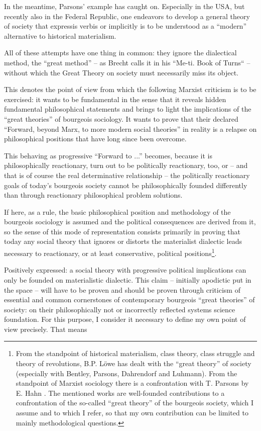 \documentclass[11pt,a4paper]{article}
\begin{document}
In the meantime, Parsons' example has caught on. Especially in the USA, but
recently also in the Federal Republic, one endeavors to develop a general
theory of society that expressis verbis or implicitly is to be understood as a
“modern” alternative to historical materialism.

All of these attempts have one thing in common: they ignore the dialectical
method, the “great method” -- as Brecht calls it in his “Me-ti. Book of Turns“
-- without which the Great Theory on society must necessarily miss its object.

This denotes the point of view from which the following Marxist criticism is
to be exercised: it wants to be fundamental in the sense that it reveals
hidden fundamental philosophical statements and brings to light the
implications of the “great theories” of bourgeois sociology. It wants to prove
that their declared \enquote{Forward, beyond Marx, to more modern social
  theories} in reality is a relapse on philosophical positions that have long
since been overcome.

This behaving as progressive \enquote{Forward to ...} becomes, because it is
philosophically reactionary, turn out to be politically reactionary, too, or
-- and that is of course the real determinative relationship -- the
politically reactionary goals of today's bourgeois society cannot be
philosophically founded differently than through reactionary philosophical
problem solutions.

If here, as a rule, the basic philosophical position and methodology of the
bourgeois sociology is assumed and the political consequences are derived from
it, so the sense of this mode of representation consists primarily in proving
that today any social theory that ignores or distorts the materialist
dialectic leads necessary to reactionary, or at least conservative, political
positions\footnote{From the standpoint of historical materialism, class
  theory, class struggle and theory of revolutions, B.P. Löwe \cite{Loewe1971}
  has dealt with the \enquote{great theory} of society (especially with
  Bentley, Parsons, Dahrendorf and Luhmann).  From the standpoint of Marxist
  sociology there is a confrontation with T. Parsons by E. Hahn
  \cite{Hahn1965}.  The mentioned works are well-founded contributions to a
  confrontation of the so-called \enquote{great theory} of the bourgeois
  society, which I assume and to which I refer, so that my own contribution
  can be limited to mainly methodological questions.}.

Positively expressed: a social theory with progressive political implications
can only be founded on materialistic dialectic. This claim -- initially
apodictic put in the space -- will have to be proven and should be proven
through criticism of essential and common cornerstones of contemporary
bourgeois \enquote{great theories} of society: on their philosophically not or
incorrectly reflected systems science foundation. For this purpose, I
consider it necessary to define my own point of view precisely. That means
\end{document}
